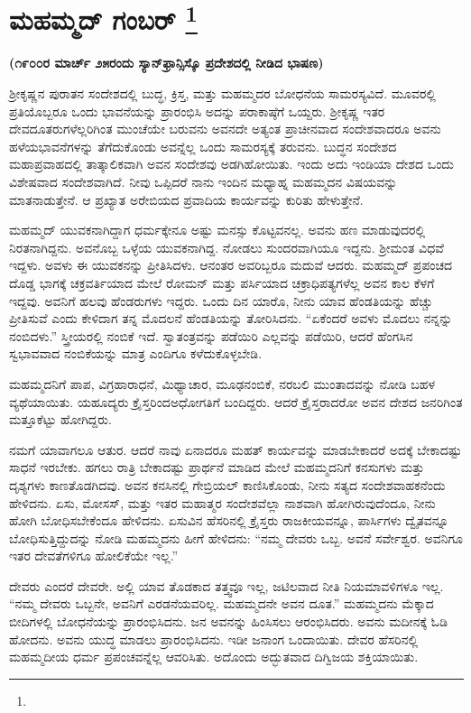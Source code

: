 
\chapter[ಮಹಮ್ಮದ್ ಗಂಬರ್ ]{ಮಹಮ್ಮದ್ ಗಂಬರ್ \protect\footnote{}}

\centerline{\textbf{(೧೯೦೦ರ ಮಾರ್ಚ್​ ೨೫ರಂದು ಸ್ಯಾನ್​ಫ್ರಾನ್ಸಿಸ್ಕೊ ಪ್ರದೇಶದಲ್ಲಿ ನೀಡಿದ ಭಾಷಣ)}}

ಶ‍್ರೀಕೃಷ್ಣನ ಪುರಾತನ ಸಂದೇಶದಲ್ಲಿ ಬುದ್ಧ, ಕ್ರಿಸ್ತ, ಮತ್ತು ಮಹಮ್ಮದರ ಬೋಧನೆಯ ಸಾಮರಸ್ಯವಿದೆ. ಮೂವರಲ್ಲಿ ಪ್ರತಿಯೊಬ್ಬರೂ ಒಂದು ಭಾವನೆಯನ್ನು ಪ್ರಾರಂಭಿಸಿ ಅದನ್ನು ಪರಾಕಾಷ್ಠೆಗೆ ಒಯ್ದರು. ಶ‍್ರೀಕೃಷ್ಣ ಇತರ ದೇವದೂತರುಗಳೆಲ್ಲರಿಗಿಂತ ಮುಂಚೆಯೇ ಬರುವನು ಅವನದೇ ಅತ್ಯಂತ ಪ್ರಾಚೀನವಾದ ಸಂದೇಶವಾದರೂ ಅವನು ಹಳೆಯ\break ಭಾವನೆಗಳನ್ನು ತೆಗೆದುಕೊಂಡು ಅವನ್ನೆಲ್ಲ ಒಂದು ಸಾಮರಸ್ಯಕ್ಕೆ ತರುವನು. ಬುದ್ಧನ ಸಂದೇಶದ ಮಹಾಪ್ರವಾಹದಲ್ಲಿ ತಾತ್ಕಾಲಿಕವಾಗಿ ಅವನ ಸಂದೇಶವು ಅಡಗಿಹೋಯಿತು. ಇಂದು ಅದು ಇಂಡಿಯಾ ದೇಶದ ಒಂದು ವಿಶೇಷವಾದ ಸಂದೇಶವಾಗಿದೆ. ನೀವು ಒಪ್ಪಿದರೆ ನಾನು ಇಂದಿನ ಮಧ್ಯಾಹ್ನ ಮಹಮ್ಮದನ ವಿಷಯವನ್ನು ಮಾತನಾಡುತ್ತೇನೆ. ಆ ಪ್ರಖ್ಯಾತ ಅರೇಬಿಯದ ಪ್ರವಾದಿಯ ಕಾರ್ಯವನ್ನು ಕುರಿತು ಹೇಳುತ್ತೇನೆ.

ಮಹಮ್ಮದ್​ ಯುವಕನಾಗಿದ್ದಾಗ ಧರ್ಮಕ್ಕೇನೂ ಅಷ್ಟು ಮನಸ್ಸು ಕೊಟ್ಟವನಲ್ಲ. ಅವನು ಹಣ ಮಾಡುವುದರಲ್ಲಿ ನಿರತನಾಗಿದ್ದನು. ಅವನೊಬ್ಬ ಒಳ್ಳೆಯ ಯುವಕನಾಗಿದ್ದ. ನೋಡಲು ಸುಂದರವಾಗಿಯೂ ಇದ್ದನು. ಶ‍್ರೀಮಂತ ವಿಧವೆ ಇದ್ದಳು. ಅವಳು ಈ ಯುವಕನನ್ನು ಪ್ರೀತಿಸಿದಳು. ಆನಂತರ ಅವರಿಬ್ಬರೂ ಮದುವೆ ಆದರು. ಮಹಮ್ಮದ್​ ಪ್ರಪಂಚದ ದೊಡ್ಡ ಭಾಗಕ್ಕೆ ಚಕ್ರವರ್ತಿಯಾದ ಮೇಲೆ ರೋಮನ್​ ಮತ್ತು ಪರ್ಸಿಯಾದ ಚಕ್ರಾಧಿಪತ್ಯಗಳೆಲ್ಲ ಅವನ ಕಾಲ ಕೆಳಗೆ ಇದ್ದವು. ಅವನಿಗೆ ಹಲವು ಹೆಂಡರುಗಳು ಇದ್ದರು. ಒಂದು ದಿನ ಯಾರೊ, ನೀನು ಯಾವ ಹೆಂಡತಿಯನ್ನು ಹೆಚ್ಚು ಪ್ರೀತಿಸುವೆ ಎಂದು ಕೇಳಿದಾಗ ತನ್ನ ಮೊದಲನೆ ಹೆಂಡತಿಯನ್ನು ತೋರಿಸಿದನು. “ಏಕೆಂದರೆ ಅವಳು ಮೊದಲು ನನ್ನನ್ನು ನಂಬಿದಳು.” ಸ್ತ್ರೀಯರಲ್ಲಿ ನಂಬಿಕೆ ಇದೆ. ಸ್ವಾತಂತ್ರವನ್ನು ಪಡೆಯಿರಿ ಎಲ್ಲವನ್ನು ಪಡೆಯಿರಿ, ಆದರೆ ಹೆಂಗಸಿನ ಸ್ವಭಾವವಾದ ನಂಬಿಕೆಯನ್ನು ಮಾತ್ರ ಎಂದಿಗೂ ಕಳೆದುಕೊಳ್ಳಬೇಡಿ.

ಮಹಮ್ಮದನಿಗೆ ಪಾಪ, ವಿಗ್ರಹಾರಾಧನೆ, ಮಿಥ್ಯಾಚಾರ, ಮೂಢನಂಬಿಕೆ, ನರಬಲಿ ಮುಂತಾದವನ್ನು ನೋಡಿ ಬಹಳ ವ್ಯಥೆಯಾಯಿತು. ಯಹೂದ್ಯರು ಕ್ರೈಸ್ತರಿಂದ\break ಅಧೋಗತಿಗೆ ಬಂದಿದ್ದರು. ಆದರೆ ಕ್ರೈಸ್ತರಾದರೋ ಅವನ ದೇಶದ ಜನರಿಗಿಂತ ಮತ್ತೂ\break ಕೆಟ್ಟು ಹೋಗಿದ್ದರು.

ನಮಗೆ ಯಾವಾಗಲೂ ಆತುರ. ಆದರೆ ನಾವು ಏನಾದರೂ ಮಹತ್​ ಕಾರ್ಯವನ್ನು ಮಾಡಬೇಕಾದರೆ ಅದಕ್ಕೆ ಬೇಕಾದಷ್ಟು ಸಾಧನೆ ಇರಬೇಕು. ಹಗಲು ರಾತ್ರಿ ಬೇಕಾದಷ್ಟು ಪ್ರಾರ್ಥನೆ ಮಾಡಿದ ಮೇಲೆ ಮಹಮ್ಮದನಿಗೆ ಕನಸುಗಳು ಮತ್ತು ದೃಶ್ಯಗಳು ಕಾಣತೊಡಗಿದವು. ಅವನ ಕನಸಿನಲ್ಲಿ ಗೇಬ್ರಿಯಲ್​ ಕಾಣಿಸಿಕೊಂಡು, ನೀನು ಸತ್ಯದ ಸಂದೇಶವಾಹಕನೆಂದು ಹೇಳಿದನು. ಏಸು, ಮೋಸಸ್​, ಮತ್ತು ಇತರ ಮಹಾತ್ಮರ ಸಂದೇಶವೆಲ್ಲಾ ನಾಶವಾಗಿ ಹೋಗಿರುವುದೆಂದೂ, ನೀನು ಹೋಗಿ ಬೋಧಿಸಬೇಕೆಂದೂ ಹೇಳಿದನು. ಏಸುವಿನ ಹೆಸರಿನಲ್ಲಿ ಕ್ರೈಸ್ತರು ರಾಜಕೀಯವನ್ನೂ, ಪಾರ್ಸಿಗಳು ದ್ವೈತವನ್ನೂ ಬೋಧಿಸುತ್ತಿದ್ದುದನ್ನು ನೋಡಿ ಮಹಮ್ಮದನು ಹೀಗೆ ಹೇಳಿದನು: “ನಮ್ಮ ದೇವರು ಒಬ್ಬ. ಅವನೆ ಸರ್ವೇಶ್ವರ. ಅವನಿಗೂ ಇತರ ದೇವತೆಗಳಿಗೂ ಹೋಲಿಕೆಯೇ ಇಲ್ಲ.”

ದೇವರು ಎಂದರೆ ದೇವರೇ. ಅಲ್ಲಿ ಯಾವ ತೊಡಕಾದ ತತ್ತ್ವವೂ ಇಲ್ಲ, ಜಟಿಲವಾದ ನೀತಿ ನಿಯಮಾವಳಿಗಳೂ ಇಲ್ಲ. “ನಮ್ಮ ದೇವರು ಒಬ್ಬನೇ, ಅವನಿಗೆ ಎರಡನೆಯವರಿಲ್ಲ. ಮಹಮ್ಮದನೇ ಅವನ ದೂತ.” ಮಹಮ್ಮದನು ಮೆಕ್ಕಾದ ಬೀದಿಗಳಲ್ಲಿ ಬೋಧನೆಯನ್ನು ಪ್ರಾರಂಭಿಸಿದನು. ಜನ ಅವನನ್ನು ಹಿಂಸಿಸಲು ಆರಂಭಿಸಿದರು. ಅವನು ಮದೀನಕ್ಕೆ ಓಡಿ ಹೋದನು. ಅವನು ಯುದ್ಧ ಮಾಡಲು ಪ್ರಾರಂಭಿಸಿದನು. ಇಡೀ ಜನಾಂಗ ಒಂದಾಯಿತು. ದೇವರ ಹೆಸರಿನಲ್ಲಿ ಮಹಮ್ಮದೀಯ ಧರ್ಮ ಪ್ರಪಂಚವನ್ನೆಲ್ಲ ಆವರಿಸಿತು. ಅದೊಂದು ಅದ್ಭುತವಾದ ದಿಗ್ವಿಜಯ ಶಕ್ತಿಯಾಯಿತು.

